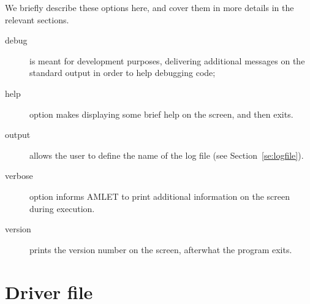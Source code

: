 We briefly describe these options here, and cover them in more details
in the relevant sections.
\begin{description}
\item[debug] is meant for development purposes, delivering additional
  messages on the standard output in order to help debugging code;
\item[help] option makes \amlet{} displaying some brief help on the
  screen, and then exits.
\item[output] allows the user to define the name of the log
file (see Section~\ref{se:logfile}).
\item[verbose] option informs AMLET to print additional information on
  the screen during execution.
\item[version] prints the version number on the screen, afterwhat
the program exits.
\end{description}

\section{Driver file}
\label{sec:driver}

